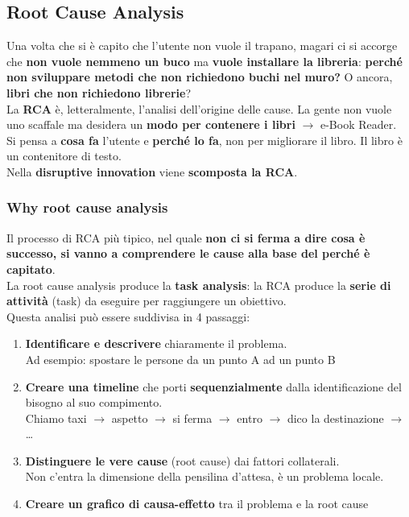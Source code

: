 \documentclass[10pt]{article}
\begin{document}
\subsection{Root Cause Analysis}
Una volta che si è capito che l'utente non vuole il trapano, magari ci si accorge che \textbf{non vuole nemmeno un buco} ma \textbf{vuole installare la libreria}: \textbf{perché non sviluppare metodi che non richiedono buchi nel muro?} O ancora, \textbf{libri che non richiedono librerie}?\\
La \textbf{RCA} è, letteralmente, l'analisi dell'origine delle cause. La gente non vuole uno scaffale ma desidera un \textbf{modo per contenere i libri} $\longrightarrow$ e-Book Reader.\\
Si pensa a \textbf{cosa fa} l'utente e \textbf{perché lo fa}, non per migliorare il libro. Il libro è un contenitore di testo.\\
Nella \textbf{disruptive innovation} viene \textbf{scomposta la RCA}.
\subsubsection{Why root cause analysis}
Il processo di RCA più tipico, nel quale \textbf{non ci si ferma a dire cosa è successo, si vanno a comprendere le cause alla base del perché è capitato}.\\
La root cause analysis produce la \textbf{task analysis}: la RCA produce la \textbf{serie di attività} (task) da eseguire per raggiungere un obiettivo.\\
Questa analisi può essere suddivisa in 4 passaggi:
\begin{enumerate}
\item \textbf{Identificare e descrivere} chiaramente il problema.\\
Ad esempio: spostare le persone da un punto A ad un punto B
\item \textbf{Creare una timeline} che porti \textbf{sequenzialmente} dalla identificazione del bisogno al suo compimento.\\
Chiamo taxi $\rightarrow$ aspetto $\rightarrow$ si ferma $\rightarrow$ entro $\rightarrow$ dico la destinazione $\rightarrow$\ldots
\item \textbf{Distinguere le vere cause} (root cause) dai fattori collaterali.\\
Non c'entra la dimensione della pensilina d'attesa, è un problema locale.
\item \textbf{Creare un grafico di causa-effetto} tra il problema e la root cause
\end{enumerate}
\end{document}
